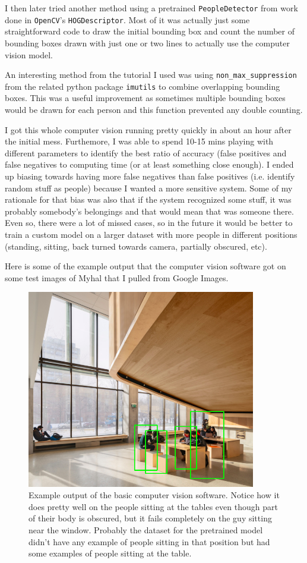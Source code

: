 \documentclass[a4paper,12pt]{gress}
\begin{document}
I then later tried another method using a pretrained \lstinline{PeopleDetector} from work done in \lstinline{OpenCV}'s \lstinline{HOGDescriptor}. Most of it was actually just some straightforward code to draw the initial bounding box and count the number of bounding boxes drawn with just one or two lines to actually use the computer vision model.

An interesting method from the tutorial I used was using \lstinline{non_max_suppression} from the related python package \lstinline{imutils} to combine overlapping bounding boxes. This was a useful improvement as sometimes multiple bounding boxes would be drawn for each person and this function prevented any double counting.

I got this whole computer vision running pretty quickly in about an hour after the initial mess. Furthemore, I was able to spend 10-15 mins playing with different parameters to identify the best ratio of accuracy (false positives and false negatives to computing time (or at least something close enough). I ended up biasing towards having more false negatives than false positives (i.e. identify random stuff as people) because I wanted a more sensitive system. Some of my rationale for that bias was also that if the system recognized some stuff, it was probably somebody's belongings and that would mean that was someone there. Even so, there were a lot of missed cases, so in the future it would be better to train a custom model on a larger dataset with more people in different positions (standing, sitting, back turned towards camera, partially obscured, etc).

Here is some of the example output that the computer vision software got on some test images of Myhal that I pulled from Google Images.

\begin{figure}[H]
  \begin{center}
  \includegraphics[width=100mm, scale=0.2]{pictures/myhal1.png}
  \caption{Example output of the basic computer vision software. Notice how it does pretty well on the people sitting at the tables even though part of their body is obscured, but it fails completely on the guy sitting near the window. Probably the dataset for the pretrained model didn't have any example of people sitting in that position but had some examples of people sitting at the table.}
  \end{center}
\end{figure}
\end{document}
